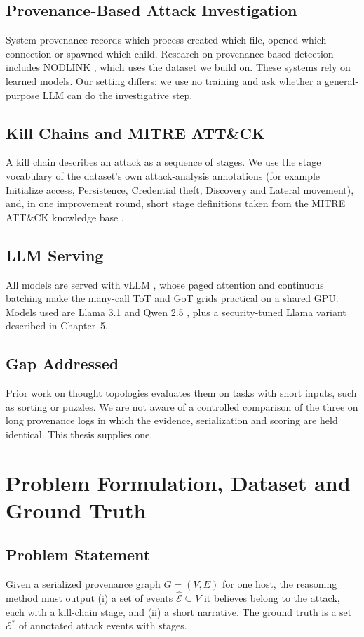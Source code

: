\documentclass[a4paper, 12pt]{report}
\theoremstyle{definition}
\begin{document}
\section{Provenance-Based Attack Investigation}
System provenance records which process created which file, opened which connection or spawned which child. Research on provenance-based detection includes NODLINK \cite{li2024nodlink}, which uses the dataset we build on. These systems rely on learned models. Our setting differs: we use no training and ask whether a general-purpose LLM can do the investigative step.

\section{Kill Chains and MITRE ATT\&CK}
A kill chain describes an attack as a sequence of stages. We use the stage vocabulary of the dataset's own attack-analysis annotations (for example Initialize access, Persistence, Credential theft, Discovery and Lateral movement), and, in one improvement round, short stage definitions taken from the MITRE ATT\&CK knowledge base \cite{mitre}.

\section{LLM Serving}
All models are served with vLLM \cite{kwon2023vllm}, whose paged attention and continuous batching make the many-call ToT and GoT grids practical on a shared GPU. Models used are Llama 3.1 \cite{dubey2024llama3} and Qwen 2.5 \cite{yang2024qwen25}, plus a security-tuned Llama variant described in Chapter~5.

\section{Gap Addressed}
Prior work on thought topologies evaluates them on tasks with short inputs, such as sorting or puzzles. We are not aware of a controlled comparison of the three on long provenance logs in which the evidence, serialization and scoring are held identical. This thesis supplies one.

\chapter{Problem Formulation, Dataset and Ground Truth}
\label{chap.3}
\section{Problem Statement}
Given a serialized provenance graph $G=(V,E)$ for one host, the reasoning method must output (i) a set of events $\hat{\mathcal{E}}\subseteq V$ it believes belong to the attack, each with a kill-chain stage, and (ii) a short narrative. The ground truth is a set $\mathcal{E}^{*}$ of annotated attack events with stages.
\end{document}
